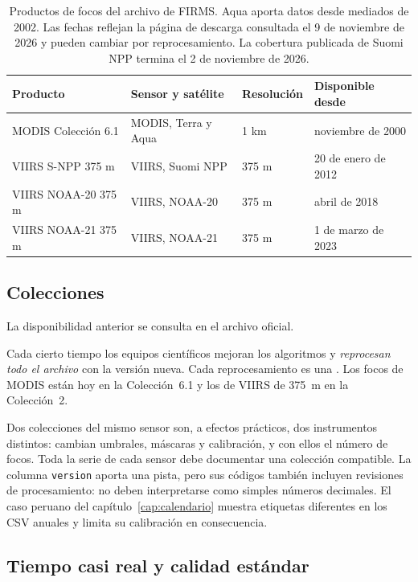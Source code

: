 \begin{table}[ht]
\centering
\begin{tabular}{llll}
\toprule
Producto & Sensor y satélite & Resolución & Disponible desde \\
\midrule
MODIS Colección 6.1 & MODIS, Terra y Aqua & 1 km & noviembre de 2000 \\
VIIRS S-NPP 375 m & VIIRS, Suomi NPP & 375 m & 20 de enero de 2012 \\
VIIRS NOAA-20 375 m & VIIRS, NOAA-20 & 375 m & abril de 2018 \\
VIIRS NOAA-21 375 m & VIIRS, NOAA-21 & 375 m & 1 de marzo de 2023 \\
\bottomrule
\end{tabular}
\caption{Productos de focos del archivo de FIRMS. Aqua aporta datos desde mediados de 2002. Las
fechas reflejan la página de descarga consultada el 9 de noviembre de 2026 y pueden cambiar
por reprocesamiento. La cobertura publicada de Suomi NPP termina el 2 de noviembre de 2026.}
\label{tab:productos}
\end{table}

\subsection{Colecciones}

La disponibilidad anterior se consulta en el archivo oficial.

Cada cierto tiempo los equipos científicos mejoran los algoritmos y \emph{reprocesan todo el
archivo} con la versión nueva. Cada reprocesamiento es una . Los focos de
MODIS están hoy en la Colección~6.1 y los de VIIRS de 375~m en la Colección~2.

\begin{atencion}
Dos colecciones del mismo sensor son, a efectos prácticos, dos instrumentos distintos: cambian
umbrales, máscaras y calibración, y con ellos el número de focos. Toda la serie de cada sensor
debe documentar una colección compatible. La columna \texttt{version} aporta una pista,
pero sus códigos también incluyen revisiones de procesamiento: no deben interpretarse
como simples números decimales. El caso peruano del capítulo~\ref{cap:calendario}
muestra etiquetas diferentes en los CSV anuales y limita su calibración en consecuencia.
\end{atencion}

\subsection{Tiempo casi real y calidad estándar}

